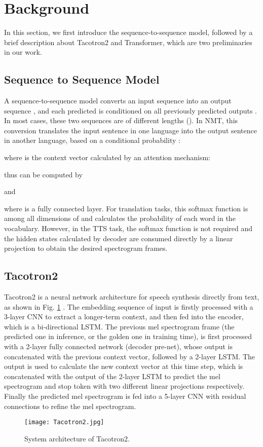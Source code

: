 \documentclass[letterpaper]{article} \usepackage{aaai19}  \usepackage{times}  \usepackage{helvet}  \usepackage{courier}  \usepackage{url}  \usepackage{graphicx}  \frenchspacing
\begin{document}
\section{Background}
In this section, we first introduce the sequence-to-sequence model, followed by a brief description about Tacotron2 and Transformer, which are two preliminaries in our work.
\subsection{Sequence to Sequence Model}

A sequence-to-sequence model \cite{sutskever2014sequence,bahdanau2014neural} converts an input sequence  into an output sequence , and each predicted  is conditioned on all previously predicted outputs . In most cases, these two sequences are of different lengths ().
In NMT, this conversion translates the input sentence in one language into the output sentence in another language, based on a conditional probability :

where  is the context vector calculated by an attention mechanism:

thus  can be computed by

and

where  is a fully connected layer. For translation tasks, this softmax function is among all dimensions of  and calculates the probability of each word in the vocabulary. However, in the TTS task, the softmax function is not required and the hidden states  calculated by decoder are consumed directly by a linear projection to  obtain the desired spectrogram frames.

\subsection{Tacotron2}

Tacotron2 is a neural network architecture for speech synthesis directly from text, as shown in Fig. \ref{fig:tacotron2} . The embedding sequence of input is firstly processed with a 3-layer CNN to extract a longer-term context, and then fed into the encoder, which is a bi-directional LSTM. The previous mel spectrogram frame (the predicted one in inference, or the golden one in training time), is first processed with a 2-layer fully connected network (decoder pre-net), whose output is concatenated with the previous context vector, followed by a 2-layer LSTM. The output is used to calculate the new context vector at this time step, which is concatenated with the output of the 2-layer LSTM to predict the mel spectrogram and stop token with two different linear projections respectively. Finally the predicted mel spectrogram is fed into a 5-layer CNN with residual connections to refine the mel spectrogram.
\begin{figure}[tb]
  \centering
  \texttt{[image: Tacotron2.jpg]}
  \caption{System architecture of Tacotron2.}
  \label{fig:tacotron2}
\end{figure}
\end{document}
